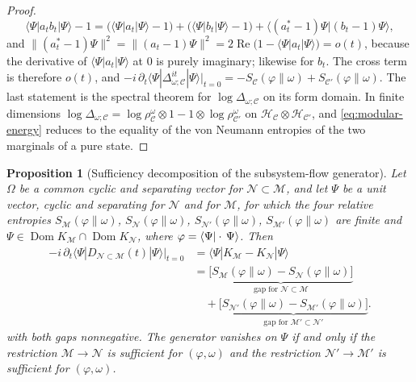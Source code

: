\documentclass[a4paper,11pt]{article}
\newtheorem{proposition}[theorem]{Proposition}
\theoremstyle{definition}
\newcommand{\nn}{\nonumber}
\newcommand{\mN}{\mathcal{N}}
\newcommand{\mM}{\mathcal{M}}
\begin{document}
\begin{proof}
\begin{equation}
 \langle\Psi|a_tb_t|\Psi\rangle-1
 =\bigl(\langle\Psi|a_t|\Psi\rangle-1\bigr)+\bigl(\langle\Psi|b_t|\Psi\rangle-1\bigr)
 +\langle(a_t^*-1)\Psi|(b_t-1)\Psi\rangle,
\end{equation}
and $\|(a_t^*-1)\Psi\|^2=\|(a_t-1)\Psi\|^2=2\operatorname{Re}\bigl(1-\langle\Psi|a_t|\Psi\rangle\bigr)=o(t)$, because the derivative of $\langle\Psi|a_t|\Psi\rangle$ at $0$ is purely imaginary; likewise for $b_t$. The cross term is therefore $o(t)$, and
$-i\,\partial_t\langle\Psi|\Delta_{\omega;\mathcal C}^{it}|\Psi\rangle|_{t=0}=-S_{\mathcal C}(\varphi\|\omega)+S_{\mathcal C'}(\varphi\|\omega)$. The last statement is the spectral theorem for $\log\Delta_{\omega;\mathcal C}$ on its form domain. In finite dimensions $\log\Delta_{\omega;\mathcal C}=\log\rho^\omega_{\mathcal C}\otimes1-1\otimes\log\rho^\omega_{\mathcal C'}$ on $\mathcal H_{\mathcal C}\otimes\mathcal H_{\mathcal C'}$, and \eqref{eq:modular-energy} reduces to the equality of the von Neumann entropies of the two marginals of a pure state.
\end{proof}

\begin{proposition}[Sufficiency decomposition of the subsystem-flow generator]\label{prop:sufficiency}
Let $\Omega$ be a common cyclic and separating vector for $\mN\subset\mM$, and let $\Psi$ be a unit vector, cyclic and separating for $\mN$ and for $\mM$, for which the four relative entropies $S_{\mM}(\varphi\|\omega)$, $S_{\mN}(\varphi\|\omega)$, $S_{\mN'}(\varphi\|\omega)$, $S_{\mM'}(\varphi\|\omega)$ are finite and $\Psi\in\operatorname{Dom}K_{\mM}\cap\operatorname{Dom}K_{\mN}$, where $\varphi=\braket{\Psi|\cdot\,\Psi}$. Then
\begin{align}
 -i\,\partial_t\langle\Psi|D_{\mN\subset\mM}(t)|\Psi\rangle\big|_{t=0}
 &=\langle\Psi|K_{\mM}-K_{\mN}|\Psi\rangle\nn\\
 &=\underbrace{\bigl[S_{\mM}(\varphi\|\omega)-S_{\mN}(\varphi\|\omega)\bigr]}_{\text{gap for }\mN\subset\mM}\nn\\
 &\quad+\underbrace{\bigl[S_{\mN'}(\varphi\|\omega)-S_{\mM'}(\varphi\|\omega)\bigr]}_{\text{gap for }\mM'\subset\mN'} .
 \label{eq:sufficiency-decomposition}
\end{align}
with both gaps nonnegative. The generator vanishes on $\Psi$ if and only if the restriction $\mM\to\mN$ is sufficient for $(\varphi,\omega)$ and the restriction $\mN'\to\mM'$ is sufficient for $(\varphi,\omega)$.
\end{proposition}
\end{document}
